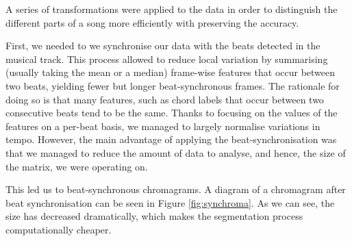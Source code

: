 A series of transformations were applied to the data in order to distinguish the different parts of a song more efficiently with preserving the accuracy.

First, we needed to we synchronise our data with the beats detected in the musical track. This process allowed to reduce local variation by summarising (usually taking the mean or a median) frame-wise features that occur between two beats, yielding fewer but longer beat-synchronous frames. The rationale for doing so is that many features, such as chord labels that occur between two consecutive beats tend to be the same. Thanks to focusing on the values of the features on a per-beat basis, we managed to largely normalise variations in tempo. However, the main advantage of applying the beat-synchronisation was that we managed to reduce the amount of data to analyse, and hence, the size of the matrix, we were operating on.

This led us to beat-synchronous chromagrams. A diagram of a chromagram after beat synchronisation can be seen in Figure \ref{fig:synchroma}. As we can see, the size has decreased dramatically, which makes the segmentation process computationally cheaper.

